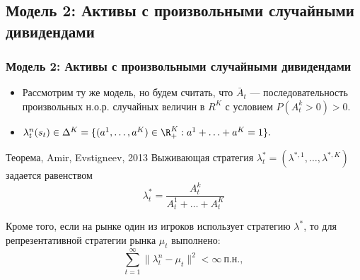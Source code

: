\documentclass[aspectratio=169]{beamer}
\theoremstyle{definition}
\theoremstyle{remark}
\begin{document}
\subsection{Модель 2: Активы с произвольными случайными дивидендами}
\begin{frame}\frametitle{Модель 2: Активы с произвольными случайными дивидендами}
    \begin{itemize}
    \item Рассмотрим ту же модель, но будем считать, что $\bar A_{t}$ — последовательность произвольных н.о.р. случайных величин в $R^K$ с условием $ P(A_t^k >0) >0.$
    
    \item $\lambda_t^n (s_t) \in \Delta^K
    =\{ (a^1, \dots, a^K) \in \R^K_+ : a^1+\ldots+a^K = 1\}.$
    \end{itemize}

    \begin{block}{Теорема, Amir, Evstigneev, 2013}
    Выживающая стратегия $\lambda_t^*=(\lambda^{*,1}, \dots, \lambda^{*,K})$ задается равенством 
    $$\lambda_t^* = \frac{A_t^k}{A_t^1+\dots +A_t^K}$$
    
    Кроме того, если на рынке один из игроков использует стратегию $\lambda^*$, то для репрезентативной стратегии рынка $\mu_t$ выполнено:
     \[
    \sum_{t=1}^\infty \|\lambda_t^n - \mu_t\|^2 < \infty\ \text{п.н.},
    \]
    \end{block}
\end{frame}

\end{document}
